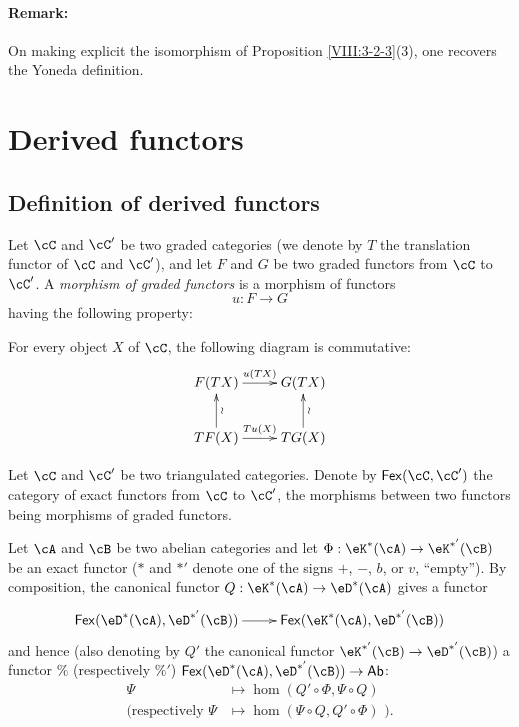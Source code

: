 \paragraph{Remark:}
On making explicit the isomorphism of Proposition
\ref{VIII:3-2-3}(3), one recovers the Yoneda definition.

\section{Derived functors}\label{VIII:4}

\subsection{Definition of derived functors}\label{VIII:4-1}

\begin{definition}\label{VIII:4-1-1}
Let $\cC$ and $\cC'$ be two graded categories (we denote by $T$ the
translation functor of $\cC$ and $\cC'$), and let $F$ and $G$ be two
graded functors from $\cC$ to $\cC'$. A \emph{morphism of graded functors}
is a morphism of functors
\[
  u:F\to G
\]
having the following property:

For every object $X$ of $\cC$, the following diagram is commutative:
\[\xymatrix{
  F(T X) \ar[r]^-{u(T X)}
    & G(T X) \\
  T F(X) \ar[r]^-{T u(X)} \ar[u]_-\wr
    & T G(X) \ar[u]_-\wr
}\]
\end{definition}

Let $\cC$ and $\cC'$ be two triangulated categories. Denote by
$\mathsf{Fex}(\cC,\cC')$ the category of exact functors from $\cC$ to
$\cC'$, the morphisms between two functors being morphisms of graded
functors.

Let $\cA$ and $\cB$ be two abelian categories and let
$\Phi:\eK^\ast(\cA)\to \eK^{\ast'}(\cB)$ be an exact functor ($\ast$ and
$\ast'$ denote one of the signs $+$, $-$, $b$, or $v$, “empty”). By
composition, the canonical functor
$Q:\eK^\ast(\cA)\to \eD^\ast(\cA)$ gives a functor
\[\xymatrix{
  \mathsf{Fex}(\eD^\ast(\cA),\eD^{\ast'}(\cB)) \ar[r]
    & \mathsf{Fex}(\eK^\ast(\cA),\eD^{\ast'}(\cB))
}\]
and hence (also denoting by $Q'$ the canonical functor
$\eK^{\ast'}(\cB) \to \eD^{\ast'}(\cB)$) a functor $\%$
(respectively $\%'$)
$\mathsf{Fex}(\eD^\ast(\cA),\eD^{\ast'}(\cB)) \to \mathsf{Ab}$:
\begin{align*}
  \Psi  &\mapsto \hom(Q'\circ \Phi,\Psi\circ Q) \\
  (\text{respectively }\Psi &\mapsto \hom(\Psi\circ Q,Q'\circ \Phi)\text{ ).}
\end{align*}

